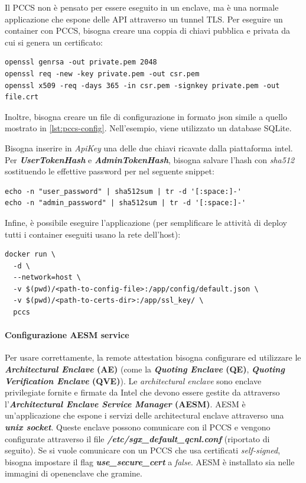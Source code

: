 \documentclass{article}
\begin{document}
Il PCCS non è pensato per essere eseguito in un enclave, ma è una normale applicazione che espone delle API attraverso un tunnel TLS. Per eseguire un container con PCCS, bisogna creare una coppia di chiavi pubblica e privata da cui si genera un certificato:
\begin{verbatim}
openssl genrsa -out private.pem 2048
openssl req -new -key private.pem -out csr.pem
openssl x509 -req -days 365 -in csr.pem -signkey private.pem -out file.crt
\end{verbatim}

Inoltre, bisogna creare un file di configurazione in formato json simile a quello mostrato in \cref{lst:pccs-config}. Nell'esempio, viene utilizzato un database SQLite.



Bisogna inserire in \textit{ApiKey} una delle due chiavi ricavate dalla piattaforma intel. Per \textbf{\textit{UserTokenHash}} e \textbf{\textit{AdminTokenHash}}, bisogna salvare l'hash con \textit{sha512} sostituendo le effettive password per nel seguente snippet:
\begin{verbatim}
echo -n "user_password" | sha512sum | tr -d '[:space:]-'
echo -n "admin_password" | sha512sum | tr -d '[:space:]-'
\end{verbatim}

Infine, è possibile eseguire l'applicazione (per semplificare le attività di deploy tutti i container eseguiti usano la rete dell'host):
\begin{verbatim}
docker run \ 
  -d \
  --network=host \
  -v $(pwd)/<path-to-config-file>:/app/config/default.json \
  -v $(pwd)/<path-to-certs-dir>:/app/ssl_key/ \ 
  pccs
\end{verbatim}

\paragraph{Configurazione AESM service}
Per usare correttamente, la remote attestation bisogna configurare ed utilizzare le \textbf{\textit{Architectural Enclave} (AE)} (come la \textbf{\textit{Quoting Enclave} (QE)}, \textbf{\textit{Quoting Verification Enclave} (QVE)}). Le \textit{architectural enclave} sono enclave privilegiate fornite e firmate da Intel che devono essere gestite da attraverso l'\textbf{\textit{Architectural Enclave Service Manager} (AESM)}. AESM è un'applicazione che espone i servizi delle architectural enclave attraverso una \textbf{\textit{unix socket}}. Queste enclave possono comunicare con il PCCS e vengono configurate attraverso il file \textbf{\textit{ /etc/sgx\_default\_qcnl.conf}} (riportato di seguito). Se si vuole comunicare con un PCCS che usa certificati \textit{self-signed}, bisogna impostare il flag \textbf{\textit{use\_secure\_cert}} a \textit{false}. AESM è installato sia nelle immagini di openenclave che gramine.
\end{document}

